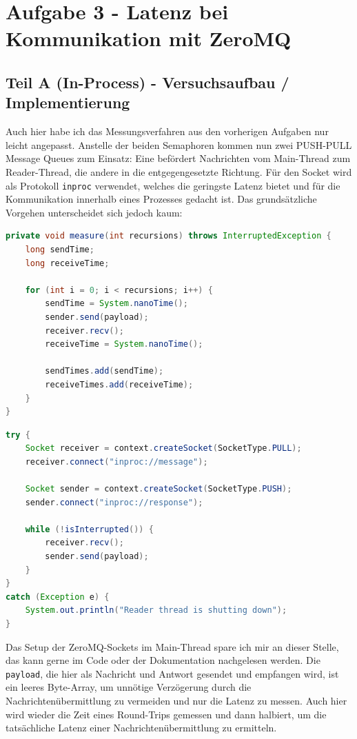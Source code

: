 \documentclass[12pt]{article}
\begin{document}
\section{Aufgabe 3 - Latenz bei Kommunikation mit ZeroMQ}
\subsection{Teil A (In-Process) - Versuchsaufbau / Implementierung}
Auch hier habe ich das Messungsverfahren aus den vorherigen Aufgaben nur leicht angepasst.
Anstelle der beiden Semaphoren kommen nun zwei PUSH-PULL Message Queues zum Einsatz: Eine befördert Nachrichten vom Main-Thread zum Reader-Thread, die andere in die entgegengesetzte Richtung.
Für den Socket wird als Protokoll \texttt{inproc} verwendet, welches die geringste Latenz bietet und für die Kommunikation innerhalb eines Prozesses gedacht ist.
Das grundsätzliche Vorgehen unterscheidet sich jedoch kaum:

\begin{lstlisting}[language=java,caption={ZeroMQ inproc: Latenzmessung im Main Thread}]
private void measure(int recursions) throws InterruptedException {
	long sendTime;
	long receiveTime;
	
	for (int i = 0; i < recursions; i++) {
		sendTime = System.nanoTime();
		sender.send(payload);
		receiver.recv();
		receiveTime = System.nanoTime();
		
		sendTimes.add(sendTime);
		receiveTimes.add(receiveTime);
	}
}
\end{lstlisting}

\begin{lstlisting}[language=java,caption={Antwort im Reader Thread}]
try {
	Socket receiver = context.createSocket(SocketType.PULL);
	receiver.connect("inproc://message");
	
	Socket sender = context.createSocket(SocketType.PUSH);
	sender.connect("inproc://response");
	
	while (!isInterrupted()) {
		receiver.recv();
		sender.send(payload);
	}
}
catch (Exception e) {
	System.out.println("Reader thread is shutting down");
}
\end{lstlisting}

Das Setup der ZeroMQ-Sockets im Main-Thread spare ich mir an dieser Stelle, das kann gerne im Code oder der Dokumentation nachgelesen werden.
Die \texttt{payload}, die hier als Nachricht und Antwort gesendet und empfangen wird, ist ein leeres Byte-Array, um unnötige Verzögerung durch die Nachrichtenübermittlung zu vermeiden und nur die Latenz zu messen.
Auch hier wird wieder die Zeit eines Round-Trips gemessen und dann halbiert, um die tatsächliche Latenz einer Nachrichtenübermittlung zu ermitteln.
\end{document}
